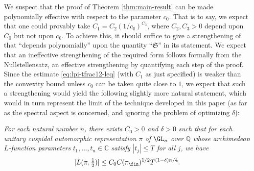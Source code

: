 \begin{remark}
  We suspect that the proof of Theorem \ref{thm:main-result} can be made polynomially effective with respect to the parameter $c_0$.  That is to say, we expect that one could provably take $C_1 = C_2 (1/c_0)^{C_3}$, where $C_2, C_3 > 0$ depend upon $C_0$ but not upon $c_0$.  To achieve this, it should suffice to give a strengthening of \cite[Theorem 15.2]{2020arXiv201202187N} that ``depends polynomially'' upon the quantity ``$\mathfrak{S}$'' in its statement.  We expect that an ineffective strengthening of the required form follows formally from the Nullstellensatz, an effective strengthening by quantifying each step of the proof.  Since the estimate \eqref{eq:lpi-tfrac12-leq} (with $C_1$ as just specified) is weaker than the convexity bound unless $c_0$ can be taken quite close to $1$, we expect that such a strengthening would yield the following slightly more natural statement, which would in turn represent the limit of the technique developed in this paper (as far as the spectral aspect is concerned, and ignoring the problem of optimizing $\delta$):

  \emph{ For each natural number $n$, there exists $C_0 > 0$ and $\delta > 0$ such that for each unitary cuspidal automorphic representation $\pi$ of $\GL_n$ over $\mathbb{Q}$ whose archimedean $L$-function parameters $t_1,\dotsc,t_n \in \mathbb{C}$ satisfy $|t_j| \leq T$ for all $j$, we have}
  \begin{equation}\label{eq:cuhjn2tftk}
    |L(\pi, \tfrac{1}{2})| \leq C_0 C(\pi_{\fin})^{1/2} T^{(1-\delta)n/4}.
  \end{equation}


\end{remark}
